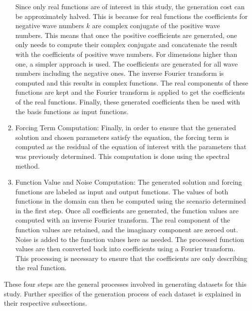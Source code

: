 \begin{enumerate}
        Since only real functions are of interest in this study, the generation cost can be approximately halved. This is because for real functions the coefficients for negative wave numbers \(k\) are complex conjugate of the positive wave numbers. This means that once the positive coefficients are generated, one only needs to compute their complex conjugate and concatenate the result with the coefficients of positive wave numbers. For dimensions higher than one, a simpler approach is used. The coefficients are generated for all wave numbers including the negative ones. The inverse Fourier transform is computed and this results in complex functions. The real components of these functions are kept and the Fourier transform is applied to get the coefficients of the real functions. Finally, these generated coefficients then be used with the basis functions as input functions.
  \item Forcing Term Computation:
        Finally, in order to ensure that the generated solution and chosen parameters satisfy the equation, the forcing term is computed as the residual of the equation of interest with the parameters that was previously determined. This computation is done using the spectral method.
  \item Function Value and Noise Computation:
        The generated solution and forcing functions are labeled as input and output functions. The values of both functions in the domain can then be computed using the scenario determined in the first step. Once all coefficients are generated, the function values are computed with an inverse Fourier transform. The real component of the function values are retained, and the imaginary component are zeroed out. Noise is added to the function values here as needed. The processed function values are then converted back into coefficients using a Fourier transform. This processing is necessary to ensure that the coefficients are only describing the real function.

\end{enumerate}

These four steps are the general processes involved in generating datasets for this study. Further specifics of the generation process of each dataset is explained in their respective subsections.

